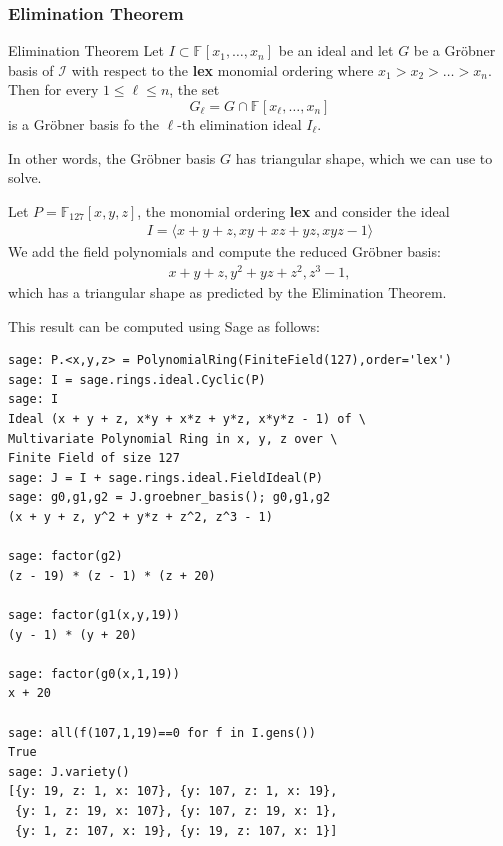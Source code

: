 \documentclass[9pt]{beamer}
\newcommand{\F}[1][]{\ensuremath{\mathbb{F}_{#1}}\xspace}
\newcommand{\I}{\ensuremath{\mathcal{I}}\xspace}
\newcommand{\ideal}[1]{\ensuremath{\langle #1\rangle}\xspace}
\begin{document}
\begin{frame}
\frametitle{Elimination Theorem}

\begin{block}{Elimination Theorem}
Let $I \subset \F{}[x_1,\dots,x_n]$ be an ideal and let $G$ be a Gröbner basis of $\I$ with respect to the \textbf{lex} monomial ordering where $x_1 > x_2 > \dots > x_n$. Then for every $1 \leq \ell \leq n$, the set 
$$G_\ell = G \cap \F{}[x_\ell,\dots,x_n]$$
is a Gröbner basis fo the $\ell$-th elimination ideal $I_\ell$. 
\end{block}

In other words, the Gröbner basis $G$ has triangular shape, which we can use to solve.

\framebreak

\begin{example}
Let $P = \F[127][x,y,z]$, the monomial ordering \textbf{lex} and consider the ideal
\begin{align*}
I = \ideal{ x + y + z, x y + x z + y z, x y z - 1}
\end{align*}
We add the field polynomials and compute the reduced Gröbner basis:
\begin{align*}
x + y + z, y^2 + yz + z^2, z^3 - 1,
\end{align*}
which has a triangular shape as predicted by the Elimination Theorem.
\end{example}

\framebreak

This result can be computed using Sage as follows:

\begin{lstlisting}
sage: P.<x,y,z> = PolynomialRing(FiniteField(127),order='lex')
sage: I = sage.rings.ideal.Cyclic(P)
sage: I
Ideal (x + y + z, x*y + x*z + y*z, x*y*z - 1) of \
Multivariate Polynomial Ring in x, y, z over \
Finite Field of size 127
sage: J = I + sage.rings.ideal.FieldIdeal(P)
sage: g0,g1,g2 = J.groebner_basis(); g0,g1,g2
(x + y + z, y^2 + y*z + z^2, z^3 - 1)

sage: factor(g2)
(z - 19) * (z - 1) * (z + 20)

sage: factor(g1(x,y,19))
(y - 1) * (y + 20)

sage: factor(g0(x,1,19))
x + 20

sage: all(f(107,1,19)==0 for f in I.gens())
True
sage: J.variety()
[{y: 19, z: 1, x: 107}, {y: 107, z: 1, x: 19}, 
 {y: 1, z: 19, x: 107}, {y: 107, z: 19, x: 1}, 
 {y: 1, z: 107, x: 19}, {y: 19, z: 107, x: 1}]
\end{lstlisting}

\end{frame}
\end{document}
